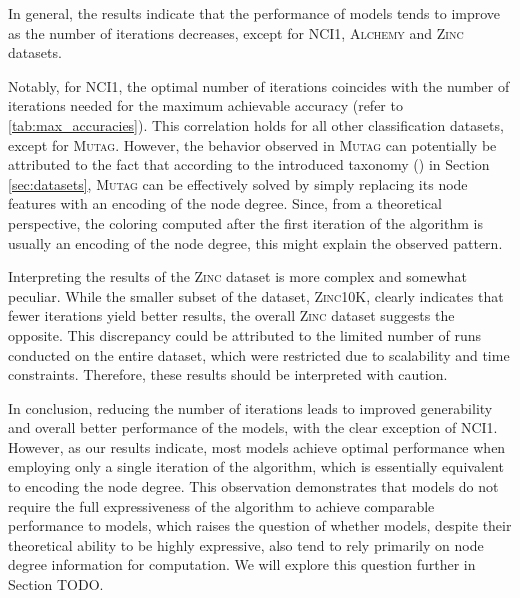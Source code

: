 In general, the results indicate that the performance of \wlnn models tends to improve as the number of \wl iterations decreases, except for \textsc{NCI1}, \textsc{Alchemy} and \textsc{Zinc} datasets. 

Notably, for \textsc{NCI1}, the optimal number of iterations coincides with the number of \wl iterations needed for the maximum achievable accuracy (refer to \cref{tab:max_accuracies}). This correlation holds for all other classification datasets, except for \textsc{Mutag}. However, the behavior observed in \textsc{Mutag} can potentially be attributed to the fact that according to the introduced taxonomy (\cite{Liu2022}) in Section \ref{sec:datasets}, \textsc{Mutag} can be effectively solved by simply replacing its node features with an encoding of the node degree. Since, from a theoretical perspective, the coloring computed after the first iteration of the \wl algorithm is usually an encoding of the node degree, this might explain the observed pattern.

Interpreting the results of the \textsc{Zinc} dataset is more complex and somewhat peculiar. While the smaller subset of the dataset, \textsc{Zinc10K}, clearly indicates that fewer \wl iterations yield better results, the overall \textsc{Zinc} dataset suggests the opposite. This discrepancy could be attributed to the limited number of runs conducted on the entire dataset, which were restricted due to scalability and time constraints. Therefore, these results should be interpreted with caution.

In conclusion, reducing the number of \wl iterations leads to improved generability and overall better performance of the models, with the clear exception of \textsc{NCI1}. However, as our results indicate, most \wlnn models achieve optimal performance when employing only a single iteration of the \wl algorithm, which is essentially equivalent to encoding the node degree. This observation demonstrates that \wlnn models do not require the full expressiveness of the \wl algorithm to achieve comparable performance to \gnn models, which raises the question of whether \gnn models, despite their theoretical ability to be highly expressive, also tend to rely primarily on node degree information for computation. We will explore this question further in Section TODO.

